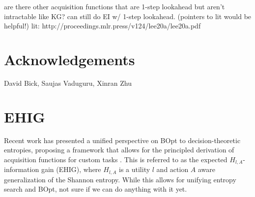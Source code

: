 \documentclass{article}
\theoremstyle{plain}
\theoremstyle{definition}
\theoremstyle{remark}
\begin{document}

are there other acquisition functions that are 1-step lookahead but aren't intractable like KG?
can still do EI w/ 1-step lookahead. (pointers to lit would be helpful!)
lit: http://proceedings.mlr.press/v124/lee20a/lee20a.pdf






\section*{Acknowledgements}
David Bick, Saujas Vaduguru, Xinran Zhu


\newpage
\appendix
\onecolumn

\section{EHIG}
Recent work has presented a unified perspective on BOpt to decision-theoretic entropies, proposing a framework that allows for the principled derivation of acquisition functions for custom tasks \citep{neiswanger2022generalizing}.
This is referred to as the expected $H_{l,A}$-information gain (EHIG),
where $H_{l,A}$ is a utility $l$ and action $A$ aware generalization of the Shannon entropy.
While this allows for unifying entropy search and BOpt, not sure if we can do anything with it yet.
\end{document}
